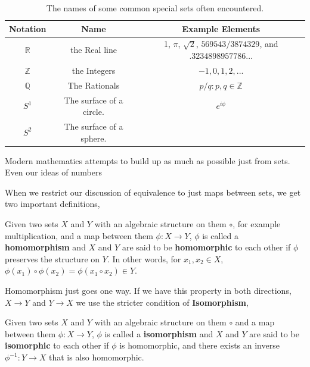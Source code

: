\begin{table}
\begin{tabular}{| c | c | c |}
  \hline
  Notation & Name & Example Elements \\
  \hline
  $\mathbb{R}$ & the Real line & 1, $\pi$, $\sqrt{2}$, $569543/3874329$, and $.3234898957786...$ \\
   $\mathbb{Z}$ & the Integers &  $-1, 0, 1, 2,...$ \\
  $\mathbb{Q}$ & The Rationals & $p/q : p,q \in \mathbb{Z}$ \\
  $S^1$ &  The surface of a circle. & $e^{i \phi} $ \\
  $S^2$ & The surface of a sphere. & \\
  \hline
\end{tabular}
  \caption{The names of some common special sets often encountered.}
  \label{tab:sets}
\end{table}



  Modern mathematics attempts to build up as much as possible just from sets.  Even our ideas of numbers

When we restrict our discussion of equivalence to just maps between sets, we get two important definitions,

\begin{definition}[Homomorphism]
  Given two sets $X$ and $Y$ with an algebraic structure on them $\circ$, for example multiplication, and a map between them $\phi:X\rightarrow Y$, $\phi$ is called a \textbf{homomorphism} and $X$ and $Y$ are said to be \textbf{homomorphic} to each other if $\phi$ preserves the structure on $Y$.  In other words, for $x_1,x_2 \in X$, $\phi(x_1)\circ \phi(x_2) = \phi(x_1 \circ x_2) \in Y$.
\end{definition}

Homomorphism just goes one way.  If we have this property in both directions, $X\rightarrow Y$ and $Y\rightarrow X$ we use the stricter condition of \textbf{Isomorphism},

\begin{definition}[Isomorphism]
  Given two sets $X$ and $Y$ with an algebraic structure on them $\circ$ and a map between them $\phi:X\rightarrow Y$, $\phi$ is called a \textbf{isomorphism} and $X$ and $Y$ are said to be \textbf{isomorphic} to each other if $\phi$ is homomorphic, and there exists an inverse $\phi^{-1}: Y \rightarrow X$ that is also homomorphic.
\end{definition}

